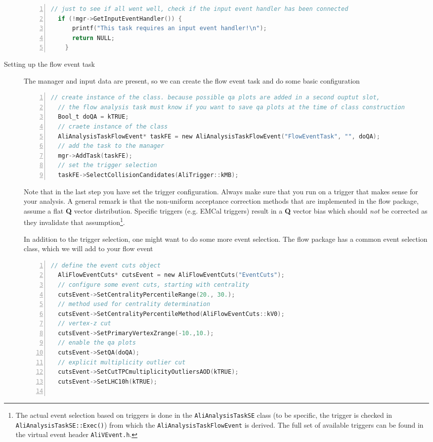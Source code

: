 \documentclass[a4paper]{book}
\numberwithin{equation}{subsection}
\begin{document}
\begin{description}
\begin{lstlisting}[language=C, numbers=left]
  // just to see if all went well, check if the input event handler has been connected
  if (!mgr->GetInputEventHandler()) {
      printf("This task requires an input event handler!\n");
      return NULL;
    }\end{lstlisting}
    \item [Setting up the flow event task]
The manager and input data are present, so we can create the flow event task and do some basic configuration
\begin{lstlisting}[language=C, numbers=left]
  // create instance of the class. because possible qa plots are added in a second ouptut slot,
  // the flow analysis task must know if you want to save qa plots at the time of class construction
  Bool_t doQA = kTRUE;
  // craete instance of the class
  AliAnalysisTaskFlowEvent* taskFE = new AliAnalysisTaskFlowEvent("FlowEventTask", "", doQA);
  // add the task to the manager
  mgr->AddTask(taskFE);
  // set the trigger selection
  taskFE->SelectCollisionCandidates(AliTrigger::kMB);\end{lstlisting}
Note that in the last step you have set the trigger configuration. Always make sure that you run on a trigger that makes sense for your analysis. A general remark is that the non-uniform acceptance correction methods that are implemented in the flow package, assume a flat \textbf{Q} vector distribution. Specific triggers (e.g. EMCal triggers) result in a \textbf{Q} vector bias which should \emph{not} be corrected as they invalidate that assumption\footnote{The actual event selection based on triggers is done in the \texttt{AliAnalysisTaskSE} class (to be specific, the trigger is checked in \texttt{AliAnalysisTaskSE::Exec()}) from which the \texttt{AliAnalysisTaskFlowEvent} is derived. The full set of available triggers can be found in the virtual event header \texttt{AliVEvent.h}. }.

In addition to the trigger selection, one might want to do some more event selection. The flow package has a common event selection class, which we will add to your flow event

\begin{lstlisting}[language=C, numbers=left]
  // define the event cuts object
  AliFlowEventCuts* cutsEvent = new AliFlowEventCuts("EventCuts");
  // configure some event cuts, starting with centrality
  cutsEvent->SetCentralityPercentileRange(20., 30.);
  // method used for centrality determination
  cutsEvent->SetCentralityPercentileMethod(AliFlowEventCuts::kV0);
  // vertex-z cut
  cutsEvent->SetPrimaryVertexZrange(-10.,10.);
  // enable the qa plots
  cutsEvent->SetQA(doQA);
  // explicit multiplicity outlier cut
  cutsEvent->SetCutTPCmultiplicityOutliersAOD(kTRUE);
  cutsEvent->SetLHC10h(kTRUE);
  

\end{lstlisting}
\end{description}
\end{document}
